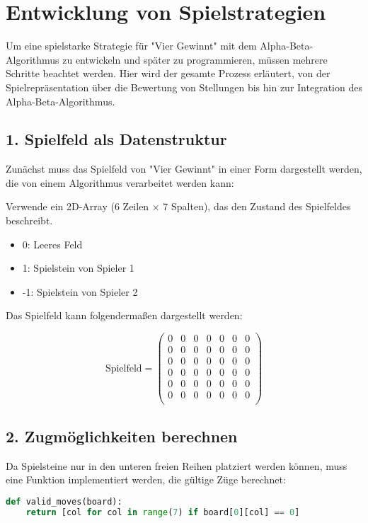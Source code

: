 \section{Entwicklung von Spielstrategien}
	
Um eine spielstarke Strategie für "Vier Gewinnt" mit dem Alpha-Beta-Algorithmus zu entwickeln und später zu programmieren, müssen mehrere Schritte beachtet werden. Hier wird der gesamte Prozess erläutert, von der Spielrepräsentation über die Bewertung von Stellungen bis hin zur Integration des Alpha-Beta-Algorithmus.

\subsection*{1. Spielfeld als Datenstruktur}
Zunächst muss das Spielfeld von "Vier Gewinnt" in einer Form dargestellt werden, die von einem Algorithmus verarbeitet werden kann:

Verwende ein 2D-Array (6 Zeilen × 7 Spalten), das den Zustand des Spielfeldes beschreibt.
\begin{itemize}
	\item 0: Leeres Feld
	\item 1: Spielstein von Spieler 1
	\item -1: Spielstein von Spieler 2
\end{itemize}

Das Spielfeld kann folgendermaßen dargestellt werden:

\[
\text{Spielfeld} =
\begin{pmatrix}
	0 & 0 & 0 & 0 & 0 & 0 & 0 \\
	0 & 0 & 0 & 0 & 0 & 0 & 0 \\
	0 & 0 & 0 & 0 & 0 & 0 & 0 \\
	0 & 0 & 0 & 0 & 0 & 0 & 0 \\
	0 & 0 & 0 & 0 & 0 & 0 & 0 \\
	0 & 0 & 0 & 0 & 0 & 0 & 0 \\
\end{pmatrix}
\]

\subsection*{2. Zugmöglichkeiten berechnen}
Da Spielsteine nur in den unteren freien Reihen platziert werden können, muss eine Funktion implementiert werden, die gültige Züge berechnet:

\begin{lstlisting}[language=Python, caption=Funktion zur Berechnung gültiger Züge]
	def valid_moves(board):
	return [col for col in range(7) if board[0][col] == 0]
\end{lstlisting}

